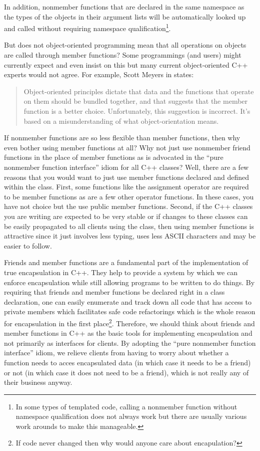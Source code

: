 \documentclass[pdf,ps2pdf,11pt]{SANDreport}
\begin{document}
In addition, nonmember functions that are declared in the same namespace as
the types of the objects in their argument lists will be automatically looked
up and called without requiring namespace qualification\footnote{In some types
of templated code, calling a nonmember function without namespace
qualification does not always work but there are usually various work arounds
to make this manageable.}.

But does not object-oriented programming mean that all operations on objects
are called through member functions?  Some programmings (and users) might
currently expect and even insist on this but many current object-oriented C++
experts would not agree.  For example, Scott Meyers in {}\cite[Item
23]{EffectiveC++3rd} states:

\begin{quote}

Object-oriented principles dictate that data and the functions that operate on
them should be bundled together, and that suggests that the member function is
a better choice.  Unfortunately, this suggestion is incorrect.  It's based on
a misunderstanding of what object-orientation means.

\end{quote}

If nonmember functions are so less flexible than member functions, then why
even bother using member functions at all?  Why not just use nonmember friend
functions in the place of member functions as is advocated in the ``pure
nonmember function interface'' idiom for all C++ classes?  Well, there are a
few reasons that you would want to just use member functions declared and
defined within the class.  First, some functions like the assignment operator
are required to be member functions as are a few other operator functions.  In
these cases, you have not choice but the use public member functions.  Second,
if the C++ classes you are writing are expected to be very stable or if
changes to these classes can be easily propagated to all clients using the
class, then using member functions is attractive since it just involves less
typing, uses less ASCII characters and may be easier to follow.

Friends and member functions are a fundamental part of the implementation of
true encapsulation in C++.  They help to provide a system by which we can
enforce encapsulation while still allowing programs to be written to do
things.  By requiring that friends and member functions be declared right in a
class declaration, one can easily enumerate and track down all code that has
access to private members which facilitates safe code refactorings which is
the whole reason for encapsulation in the first place\footnote{If code never
changed then why would anyone care about encapulation?}.  Therefore, we should
think about friends and member functions in C++ as the basic tools for
implementing encapsulation and not primarily as interfaces for clients.  By
adopting the ``pure nonmember function interface'' idiom, we relieve clients
from having to worry about whether a function needs to acces encapsulated data
(in which case it needs to be a friend) or not (in which case it does not need
to be a friend), which is not really any of their business anyway.
\end{document}
